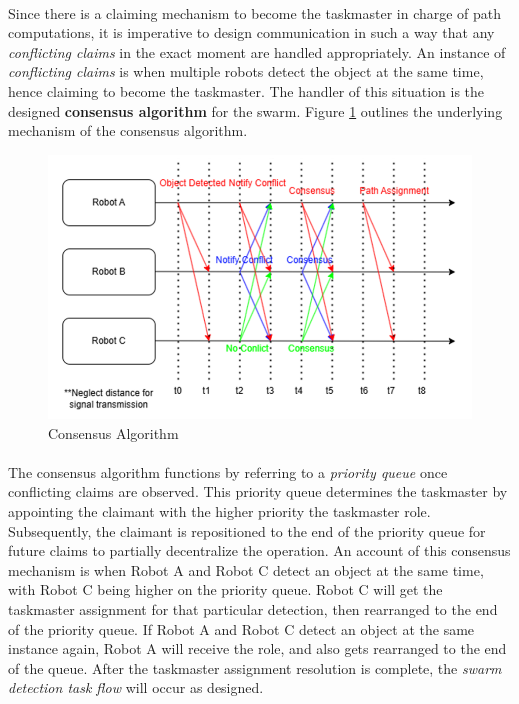 \paragraph*{}
Since there is a claiming mechanism to become the taskmaster in charge of path computations, it is imperative to design communication in such a way that any \textit{conflicting claims} in the exact moment are handled appropriately. An instance of \textit{conflicting claims} is when multiple robots detect the object at the same time, hence claiming to become the taskmaster. The handler of this situation is the designed \textbf{consensus algorithm} for the swarm. Figure \ref{fig:consensus-algorithm} outlines the underlying mechanism of the consensus algorithm.

\begin{figure} [H]
    \centering
    \includegraphics[width=0.9\linewidth]{assets/images/communication/consensus.png}
    \caption{Consensus Algorithm}
    \label{fig:consensus-algorithm}
\end{figure}

\paragraph*{}
The consensus algorithm functions by referring to a \textit{priority queue} once conflicting claims are observed. This priority queue determines the taskmaster by appointing the claimant with the higher priority the taskmaster role. Subsequently, the claimant is repositioned to the end of the priority queue for future claims to partially decentralize the operation. An account of this consensus mechanism is when Robot A and Robot C detect an object at the same time, with Robot C being higher on the priority queue. Robot C will get the taskmaster assignment for that particular detection, then rearranged to the end of the priority queue. If Robot A and Robot C detect an object at the same instance again, Robot A will receive the role, and also gets rearranged to the end of the queue. After the taskmaster assignment resolution is complete, the \textit{swarm detection task flow} will occur as designed.

